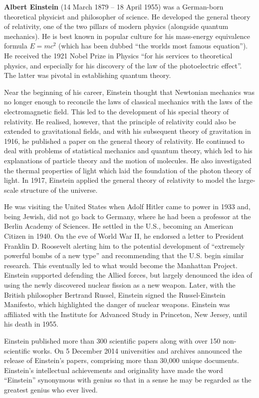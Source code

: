 \documentclass[twocolumn]{article}
\begin{document}
\textbf{Albert Einstein} (14 March 1879 -- 18 April 1955) was
a German-born theoretical physicist and philosopher of science. He
developed the general theory of relativity, one of the two pillars
of modern physics (alongside quantum mechanics). He is best known
in popular culture for his mass-energy equivalence formula $E = mc^2$
(which has been dubbed ``the worlds most famous equation''). He received
the 1921 Nobel Prize in Physics ``for his services to theoretical physics,
and especially for his discovery of the law of the photoelectric effect''.
The latter was pivotal in establishing quantum theory.

Near the beginning of his career, Einstein thought that Newtonian
mechan\-ics was no longer enough to reconcile the laws of classical
mechan\-ics with the laws of the electromagnetic field. This led to the
development of his special theory of relativity. He realised, however, that
the principle of relativity could also be extended to gravitational fields,
and with his subsequent theory of gravitation in 1916, he published a paper
on the general theory of relativity. He continued to deal with problems of
statistical mechanics and quantum theory, which led to his explanations of
particle theory and the motion of molecules. He also investigated the
thermal properties of light which laid the foundation of the photon theory
of light. In 1917, Einstein applied the general theory of relativity to
model the large-scale structure of the universe.

He was visiting the United States when Adolf Hitler came to power in 1933
and, being Jewish, did not go back to Germany, where he had been a
professor at the Berlin Academy of Sciences. He settled in the U.S.,
becoming an American Citizen in 1940. On the eve of World War II, he
endorsed a letter to President Franklin D. Roosevelt alerting him to the
potential development of ``extremely powerful bombs of a new type'' and
recommending that the U.S. begin similar research. This eventually led
to what would become the Manhattan Project. Einstein supported defending
the Allied forces, but largely denounced the idea of using the newly 
discovered nuclear fission as a new weapon. Later, with the British
philosopher Bertrand Russel, Einstein signed the Russel-Einstein 
Manifesto, which highlighted the danger of nuclear weapons. Einstein
was affiliated with the Institute for Advanced Study in Princeton,
New Jersey, until his death in 1955.

Einstein published more than 300 scientific papers along with over
150 non-scientific works. On 5 December 2014 universities and
archives announced the release of Einstein's papers, comprising more
than 30,000 unique documents. Einstein's intellectual achievements and
originality have made the word ``Einstein'' synonymous with genius so
that in a sense he may be regarded as the greatest genius who ever lived.
\end{document}
